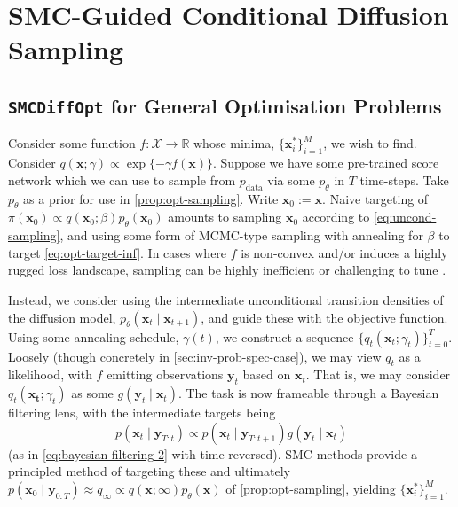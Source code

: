 \chapter{SMC-Guided Conditional Diffusion Sampling} \label{chap:methods}

\section{\texttt{SMCDiffOpt} for General Optimisation Problems} \label{sec:gen-opt}

Consider some function $f: \mathcal{X} \to \mathbb{R}$ whose minima, $\{\mathbf{x}^*_i\}_{i=1}^M$,
we wish to find. Consider $q(\mathbf{x}; \gamma) \propto \exp\{-\gamma f(\mathbf{x})\}$. Suppose we
have some pre-trained score network which we can use to sample from $p_{\text{data}}$ via some
$p_\theta$ in $T$ time-steps. Take $p_\theta$ as a prior for use in  \autoref{prop:opt-sampling}. Write
$\mathbf{x}_0 := \mathbf{x}$. Naive targeting of
$\pi(\mathbf{x}_0) \propto q(\mathbf{x}_0; \beta)p_\theta(\mathbf{x}_0)$ amounts to sampling
$\mathbf{x}_0$ according to \autoref{eq:uncond-sampling}, and using some form of MCMC-type sampling with
annealing for $\beta$ to target \autoref{eq:opt-target-inf}. In cases where $f$ is non-convex and/or
induces a highly rugged loss landscape, sampling can be highly inefficient or challenging
to tune \parencite{kongDiffusionModelsConstrained2024}.

Instead, we consider using the intermediate unconditional transition densities of the diffusion
model, $p_\theta(\mathbf{x}_{t} \mid \mathbf{x}_{t+1})$, and guide these with the objective
function. Using some annealing schedule, $\gamma(t)$, we construct a sequence
$\{q_t(\mathbf{x}_t; \gamma_t)\}_{t=0}^T$. Loosely (though concretely in
\autoref{sec:inv-prob-spec-case}), we may view $q_t$ as a likelihood, with $f$ emitting observations
$\mathbf{y}_t$ based on $\mathbf{x}_t$. That is, we may consider $q_t(\mathbf{x_t}; \gamma_t)$
as some $g(\mathbf{y}_t \mid \mathbf{x}_t)$. The task is now frameable through a Bayesian filtering
lens, with the intermediate targets being
\begin{equation}
    p(\mathbf{x}_t \mid \mathbf{y}_{T:t}) \propto p(\mathbf{x}_t \mid \mathbf{y}_{T:t+1})g(\mathbf{y}_t \mid \mathbf{x}_t)
\end{equation}
(as in \autoref{eq:bayesian-filtering-2} with time reversed). SMC methods provide a principled
method of targeting these and ultimately
$p(\mathbf{x}_0 \mid \mathbf{y}_{0:T}) \approx q_\infty \propto q(\mathbf{x}; \infty)p_\theta(\mathbf{x})$
of \autoref{prop:opt-sampling}, yielding $\{\mathbf{x}^*_i\}_{i=1}^M$.


